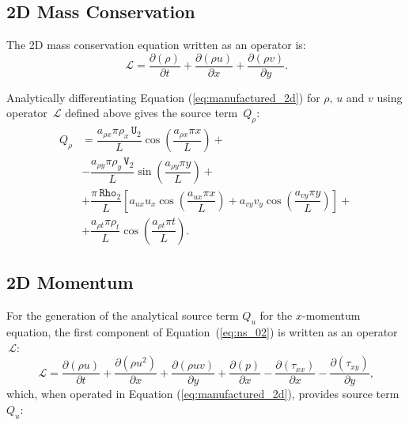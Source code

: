 \documentclass[10pt]{article}
\newcommand{\Diff}[2] {\dfrac{\partial( #1)}{\partial #2}}
\newcommand{\Rho}{\,\mathtt{Rho}}
\newcommand{\U}{\,\mathtt{U}}
\newcommand{\V}{\,\mathtt{V}}
\newcommand{\Lo}{\,\mathcal{L}}
\begin{document}
\subsection{2D Mass Conservation}

The 2D mass conservation equation written as an operator is:
\begin{equation*}
  \Lo=\Diff{\rho }{t} +  \Diff{\rho u}{x}+\Diff{\rho v}{y}.
\end{equation*}

Analytically differentiating Equation (\ref{eq:manufactured_2d}) for $\rho$, $u$ and $v$ using operator $\Lo$ defined above gives  the source term~$Q_{\rho}$:
\begin{equation}
 \begin{split}
Q_\rho &= \dfrac{a_{\rho x} \pi \rho_x \U_2 }{L}\cos\left(\dfrac{a_{\rho x} \pi x}{L}\right)+\\
&-\dfrac{a_{\rho y} \pi \rho_y \V_2 }{L}\sin\left(\dfrac{a_{\rho y} \pi y}{L}\right)+\\
&+\dfrac{\pi \Rho_2}{L}\left[a_{ux} u_x \cos\left(\dfrac{a_{ux} \pi x}{L}\right)+a_{vy} v_y \cos\left(\dfrac{a_{vy} \pi y}{L}\right)\right] +\\
&+\dfrac{a_{\rho t} \pi \rho_t }{L}\cos\left(\dfrac{a_{\rho t} \pi t}{L}\right).
 \end{split}
\end{equation}

\subsection{2D Momentum}

For the generation of the analytical source term $Q_u$ for the $x$-momentum equation, the first component of Equation~(\ref{eq:ns_02}) is written as an  operator $\Lo$:
\begin{equation*}
 \Lo= \Diff{\rho u}{t} +\Diff{\rho u^2 }{x}+\Diff{\rho uv}{y} +\Diff{p}{x}-\Diff{\tau_{xx}}{x}-\Diff{\tau_{xy}}{y},
\end{equation*}
which, when operated in Equation (\ref{eq:manufactured_2d}), provides source term $Q_{u}$:
\end{document}
